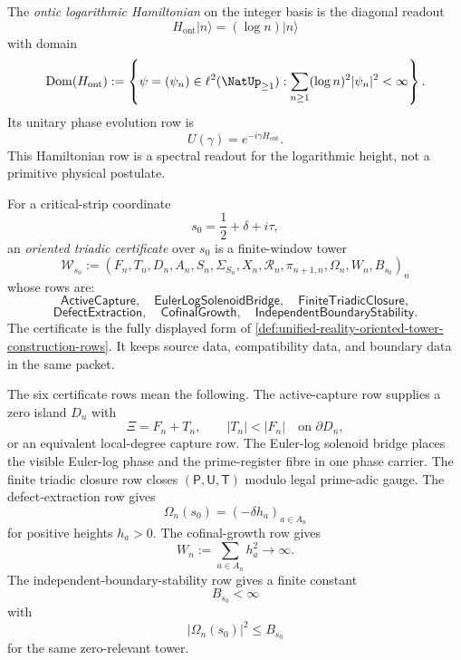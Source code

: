 
\begin{definition}
\label{def:unified-reality-ontic-logarithmic-hamiltonian}
The \emph{ontic logarithmic Hamiltonian} on the integer basis is the
diagonal readout
$$
H_{\mathrm{ont}}|n\rangle=(\log n)|n\rangle
$$
with domain
$$
\operatorname{Dom}(H_{\mathrm{ont}})
:=
\left\{
\psi=(\psi_n)\in\ell^2(\NatUp_{\ge1}):
\sum_{n\ge1}(\log n)^2|\psi_n|^2<\infty
\right\}.
$$
Its unitary phase evolution row is
$$
U(\gamma)=e^{-i\gamma H_{\mathrm{ont}}}.
$$
This Hamiltonian row is a spectral readout for the logarithmic height,
not a primitive physical postulate.
\end{definition}

\begin{definition}
\label{def:unified-reality-oriented-triadic-certificate}
For a critical-strip coordinate
$$
s_0=\frac12+\delta+i\tau,
$$
an \emph{oriented triadic certificate} over $s_0$ is a finite-window
tower
$$
\mathcal W_{s_0}
:=
(F_n,T_n,D_n,A_n,S_n,\Sigma_{S_n},X_n,\mathcal R_n,\pi_{n+1,n},
\Omega_n,W_n,B_{s_0})_n
$$
whose rows are:
$$
\mathsf{ActiveCapture},
\quad
\mathsf{EulerLogSolenoidBridge},
\quad
\mathsf{FiniteTriadicClosure},
$$
$$
\mathsf{DefectExtraction},
\quad
\mathsf{CofinalGrowth},
\quad
\mathsf{IndependentBoundaryStability}.
$$
The certificate is the fully displayed form of
\autoref{def:unified-reality-oriented-tower-construction-rows}.  It
keeps source data, compatibility data, and boundary data in the same
packet.
\end{definition}

\begin{definition}
\label{def:unified-reality-oriented-certificate-row-meanings}
The six certificate rows mean the following.
The active-capture row supplies a zero island $D_n$ with
$$
\Xi=F_n+T_n,
\qquad
|T_n|<|F_n|
\quad
\text{on }\partial D_n,
$$
or an equivalent local-degree capture row.  The Euler-log solenoid bridge
places the visible Euler-log phase and the prime-register fibre in one
phase carrier.  The finite triadic closure row closes
$(\mathsf P,\mathsf U,\mathsf T)$ modulo legal prime-adic gauge.  The
defect-extraction row gives
$$
\Omega_n(s_0)=(-\delta h_a)_{a\in A_n}
$$
for positive heights $h_a>0$.  The cofinal-growth row gives
$$
W_n:=\sum_{a\in A_n}h_a^2\to\infty.
$$
The independent-boundary-stability row gives a finite constant
$$
B_{s_0}<\infty
$$
with
$$
|\Omega_n(s_0)|^2\le B_{s_0}
$$
for the same zero-relevant tower.
\end{definition}

